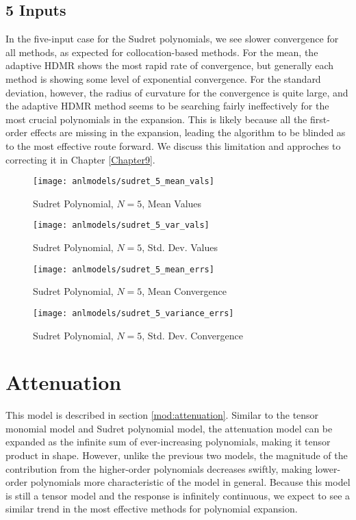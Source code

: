 \subsection{5 Inputs}
In the five-input case for the Sudret polynomials, we see slower convergence for all methods, as expected
for collocation-based methods.  For the mean, the adaptive HDMR shows the most rapid rate of convergence,
but generally each method is showing some level of exponential convergence.  For the standard deviation,
however, the radius of curvature for the convergence is quite large, and the adaptive HDMR method seems
to be searching fairly ineffectively for the most crucial polynomials in the expansion.  This is likely
because all the first-order effects are missing in the expansion, leading the algorithm to be blinded as
to the most effective route forward.  We discuss this limitation and approches to correcting it in 
Chapter \ref{Chapter9}.
\begin{figure}[H]
  \centering
  \texttt{[image: anlmodels/sudret\_5\_mean\_vals]}
  \caption{Sudret Polynomial, $N=5$, Mean Values}
  \label{fig:sudretpoly mean values 5}
\end{figure}
\begin{figure}[H]
  \centering
  \texttt{[image: anlmodels/sudret\_5\_var\_vals]}
  \caption{Sudret Polynomial, $N=5$, Std. Dev. Values}
  \label{fig:sudretpoly var values 5}
\end{figure}

\begin{figure}[H]
  \centering
  \texttt{[image: anlmodels/sudret\_5\_mean\_errs]}
  \caption{Sudret Polynomial, $N=5$, Mean Convergence}
  \label{fig:sudretpoly mean errors 5}
\end{figure}
\begin{figure}[H]
  \centering
  \texttt{[image: anlmodels/sudret\_5\_variance\_errs]}
  \caption{Sudret Polynomial, $N=5$, Std. Dev. Convergence}
  \label{fig:sudretpoly var errors 5}
\end{figure}


\section{Attenuation}
This model is described in section \ref{mod:attenuation}.  Similar to the tensor monomial model and Sudret
polynomial model, the attenuation model can be expanded as the infinite sum of ever-increasing polynomials,
making it tensor product in shape.  However, unlike the previous two models, the magnitude of the contribution
from the higher-order polynomials decreases swiftly, making lower-order polynomials more characteristic of the
model in general.  Because this model is still a tensor model and the response is infinitely continuous,
we expect to see a similar trend in the most effective methods for polynomial expansion.

